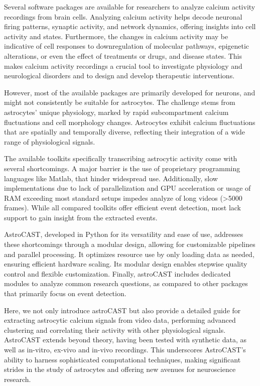 Several software packages are available for researchers to analyze calcium activity recordings from brain cells. Analyzing calcium activity helps decode neuronal firing patterns, synaptic activity, and network dynamics, offering insights into cell activity and states. Furthermore, the changes in calcium activity may be indicative of cell responses to downregulation of molecular pathways, epigenetic alterations, or even the effect of treatments or drugs, and disease states. This makes calcium activity recordings a crucial tool to investigate physiology and neurological disorders and to design and develop therapeutic interventions.

However, most of the available packages are primarily developed for neurons, and might not consistently be suitable for astrocytes. The challenge stems from astrocytes' unique physiology, marked by rapid subcompartment calcium fluctuations and cell morphology changes. Astrocytes exhibit calcium fluctuations that are spatially and temporally diverse, reflecting their integration  of a wide range of physiological signals\citep{semyanov_making_2020,smedler_frequency_2014}.

The available toolkits specifically transcribing astrocytic activity come with several shortcomings. A major barrier is the use of proprietary programming languages like Matlab, that hinder widespread use. Additionally, slow implementations due to lack of parallelization and GPU acceleration or usage of RAM exceeding most standard setups impedes analyze of long videos (>5000 frames). While all compared toolkits offer efficient event detection, most lack support to gain insight from the extracted events.

AstroCAST, developed in Python for its versatility and ease of use, addresses these shortcomings through a modular design, allowing for customizable pipelines and parallel processing.  It optimizes resource use by only loading data as needed, ensuring efficient hardware scaling. Its modular design enables stepwise quality control and flexible customization. Finally, astroCAST includes dedicated modules to analyze common research questions, as compared to other packages that primarily focus on event detection.

Here, we not only introduce astroCAST but also provide a detailed guide for extracting astrocytic calcium signals from video data, performing advanced clustering and correlating their activity with other physiological signals. AstroCAST extends beyond theory, having been tested with synthetic data, as well as in-vitro, ex-vivo and in-vivo recordings. This underscores AstroCAST’s ability to harness sophisticated computational techniques, making significant strides in the study of astrocytes and offering new avenues for neuroscience research.
